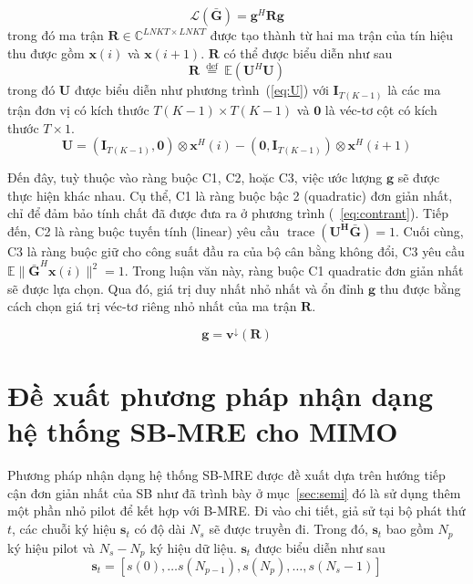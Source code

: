 \begin{equation}
\label{eq:loss_mre}
    \mathcal{L}(\bar{\mathbf{G}})=\mathbf{g}^H \mathbf{R} \mathbf{g}
\end{equation}
trong đó ma trận $\mathbf{R} \in \mathbb{C}^{LNKT \times LNKT}$ được tạo thành từ hai ma trận của tín hiệu thu được gồm $\mathbf{x}(i)$ và $\mathbf{x}(i+1)$. $\mathbf{R}$ có thể được biểu diễn như sau
\begin{equation}
\label{eq:R}
\mathbf{R} \stackrel{\text { def }}{=} \mathbb{E}\left(\mathbf{U}^{H} \mathbf{U}\right)
\end{equation}
trong đó $\mathbf{U}$ được biểu diễn như phương trình~(\ref{eq:U}) với $\mathbf{I}_{T (K-1)}$ là các ma trận đơn vị có kích thước $T(K-1) \times T(K-1)$ và $\mathbf{0}$ là véc-tơ cột có kích thước $T \times 1$.
\begin{equation}
\label{eq:U}
\mathbf{U} = \left(\mathbf{I}_{T (K-1)}, \mathbf{0}\right) \otimes \mathbf{x}^{H}(i)-\left(\mathbf{0}, \mathbf{I}_{T (K-1)}\right) \otimes \mathbf{x}^{H}(i+1)
\end{equation}

Đến đây, tuỳ thuộc vào ràng buộc C1, C2, hoặc C3, việc ước lượng $\mathbf{g}$ sẽ được thực hiện khác nhau. Cụ thể, C1 là ràng buộc bậc 2 (quadratic) đơn giản nhất, chỉ để đảm bảo tính chất đã được đưa ra ở phương trình (~\ref{eq:contrant}). Tiếp đến, C2 là ràng buộc tuyến tính (linear) yêu cầu $\operatorname{trace}(\mathbf{U^H \mathbf{\bar{G}}}) = 1$. Cuối cùng, C3 là ràng buộc giữ cho công suất đầu ra của bộ cân bằng không đổi, C3 yêu cầu $\mathbb{E}\| \mathbf{\bar{G}}^H \mathbf{x}(i) \|^2 = 1$. Trong luận văn này, ràng buộc C1 quadratic đơn giản nhất sẽ được lựa chọn. Qua đó, giá trị duy nhất nhỏ nhất và ổn đỉnh $\mathbf{g}$ thu được bằng cách chọn giá trị véc-tơ riêng nhỏ nhất của ma trận $\mathbf{R}$.

\begin{equation}
    \mathbf{g} = \mathbf{v}^{\downarrow} (\mathbf{R})
\end{equation}
\section{Đề xuất phương pháp nhận dạng hệ thống SB-MRE cho MIMO}

Phương pháp nhận dạng hệ thống SB-MRE được đề xuất dựa trên hướng tiếp cận đơn giản nhất của SB như đã trình bày ở mục~\ref{sec:semi} đó là sử dụng thêm một phần nhỏ pilot để kết hợp với B-MRE. Đi vào chi tiết, giả sử tại bộ phát thứ $t$, các chuỗi ký hiệu $\mathbf{s}_t$ có độ dài $N_s$ sẽ được truyền đi. Trong đó, $\mathbf{s}_t$ bao gồm $N_p$ ký hiệu pilot và $N_s - N_p$ ký hiệu dữ liệu. $\mathbf{s}_t$ được biểu diễn như sau
\begin{equation}
\mathbf{s}_t = \left[s(0), \ldots s\left(N_{p-1}\right), s\left(N_p\right), \ldots, s\left(N_s-1\right)\right]
\end{equation}

